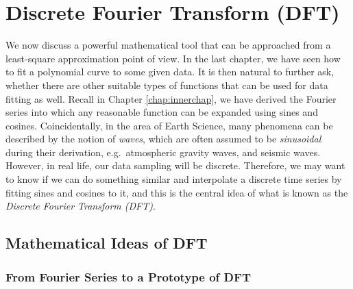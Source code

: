 \chapter{Discrete Fourier Transform (DFT)}
\label{chap:DFT}
We now discuss a powerful mathematical tool that can be approached from a least-square approximation point of view. In the last chapter, we have seen how to fit a polynomial curve to some given data. It is then natural to further ask, whether there are other suitable types of functions that can be used for data fitting as well. Recall in Chapter \ref{chap:innerchap}, we have derived the Fourier series into which any reasonable function can be expanded using sines and cosines. Coincidentally, in the area of Earth Science, many phenomena can be described by the notion of \textit{waves}, which are often assumed to be \textit{sinusoidal} during their derivation, e.g.\ atmospheric gravity waves, and seismic waves. However, in real life, our data sampling will be discrete. Therefore, we may want to know if we can do something similar and interpolate a discrete time series by fitting sines and cosines to it, and this is the central idea of what is known as the \textit{Discrete Fourier Transform (DFT)}.

\section{Mathematical Ideas of DFT}
\label{section:DFT}

\subsection{From Fourier Series to a Prototype of DFT}
\label{section:FouriertoDFT}

